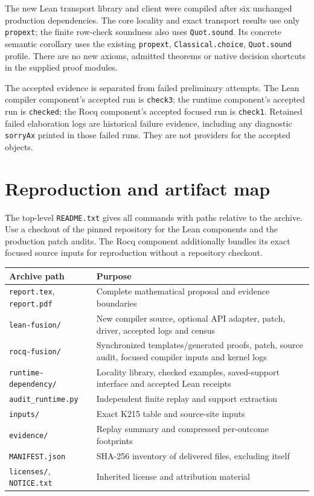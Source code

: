 \documentclass[11pt]{article}
\theoremstyle{definition}\newtheorem{definition}[theorem]{Definition}
\newcommand{\code}[1]{\texttt{#1}}
\begin{document}
The new Lean transport library and client were compiled after six unchanged
production dependencies. The core locality and exact transport results use
only \code{propext}; the finite row-check soundness also uses
\code{Quot.sound}. Its concrete semantic corollary uses the existing
\code{propext}, \code{Classical.choice}, \code{Quot.sound} profile. There are no
new axioms, admitted theorems or native decision shortcuts in the supplied
proof modules.

The accepted evidence is separated from failed preliminary attempts. The Lean
compiler component's accepted run is \code{check3}; the runtime component's
accepted run is \code{checked}; the Rocq component's accepted focused run is
\code{check1}. Retained failed elaboration logs are historical failure evidence,
including any diagnostic \code{sorryAx} printed in those failed runs. They are
not providers for the accepted objects.

\section{Reproduction and artifact map}

The top-level \code{README.txt} gives all commands with paths relative to the
archive. Use a checkout of the pinned repository for the Lean components and
the production patch audits. The Rocq component additionally bundles its exact
focused source inputs for reproduction without a repository checkout.

\begin{center}\small
\begin{tabularx}{\textwidth}{@{}p{}X@{}}
\toprule
Archive path & Purpose\\
\midrule
\code{report.tex}, \code{report.pdf} & Complete mathematical proposal and evidence boundaries\\
\code{lean-fusion/} & New compiler source, optional API adapter, patch, driver, accepted logs and census\\
\code{rocq-fusion/} & Synchronized templates/generated proofs, patch, source audit, focused compiler inputs and kernel logs\\
\code{runtime-dependency/} & Locality library, checked examples, saved-support interface and accepted Lean receipts\\
\code{audit\_runtime.py} & Independent finite replay and support extraction\\
\code{inputs/} & Exact K215 table and source-site inputs\\
\code{evidence/} & Replay summary and compressed per-outcome footprints\\
\code{MANIFEST.json} & SHA-256 inventory of delivered files, excluding itself\\
\code{licenses/}, \code{NOTICE.txt} & Inherited license and attribution material\\
\bottomrule
\end{tabularx}
\end{center}
\end{document}
